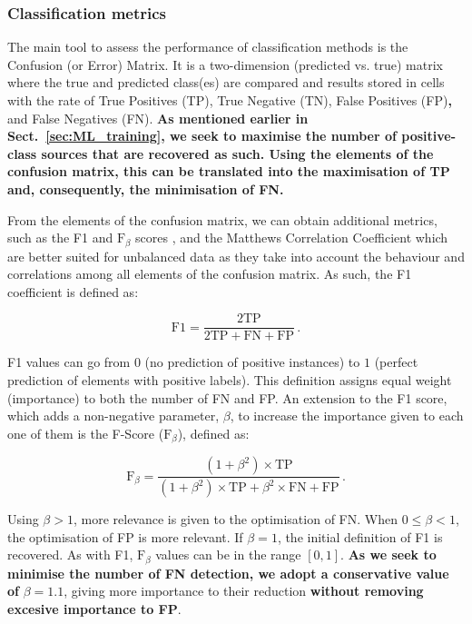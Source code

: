 \documentclass{aa}
\begin{document}
\subsubsection{Classification metrics}\label{sec:metrics_classfication}

The main tool to assess the performance of classification methods is the Confusion (or Error) Matrix. It is a two-dimension (predicted vs. true) matrix where the true and predicted class(es) are compared and results stored in cells with the rate of True Positives (TP), True Negative (TN), False Positives (FP)\textbf{,} and False Negatives (FN). \textbf{As mentioned earlier in Sect.~\ref{sec:ML_training}, we seek to maximise the number of positive-class sources that are recovered as such. Using the elements of the confusion matrix, this can be translated into the maximisation of TP and, consequently, the minimisation of FN.}

From the elements of the confusion matrix, we can obtain additional metrics, such as the F1 and $\mathrm{F}_{\beta}$ scores \citep{10.2307/1932409, sorenson1948method, van1979information}, and the Matthews Correlation Coefficient \citep[MCC;][]{10.2307/2340126, nla.cat-vn81100, MATTHEWS1975442} which are better suited for unbalanced data as they take into account the behaviour and correlations among all elements of the confusion matrix.
As such, the F1 coefficient is defined as: 

\begin{equation}\label{eq:f1}
\mathrm{F1} = \frac{2 \mathrm{TP}}{2 \mathrm{TP} + \mathrm{FN} + \mathrm{FP}}\,.
\end{equation}

\noindent 
F1 values can go from $0$ (no prediction of positive instances) to $1$ (perfect prediction of elements with positive labels). This definition assigns equal weight (importance) to both the number of FN and FP. An extension to the F1 score, which adds a non-negative parameter, $\beta$, to increase the importance given to each one of them is the F-Score ($\mathrm{F}_{\beta}$), defined as:

\begin{equation}\label{eq:f_beta}
\mathrm{F}_{\beta} = \frac{(1 + \beta^{2}) \times \mathrm{TP}}{(1 + \beta^{2}) \times \mathrm{TP} + \beta^{2} \times \mathrm{FN} + \mathrm{FP}}\,.
\end{equation}

Using ${\beta > 1}$, more relevance is given to the optimisation of FN. When ${0 \leq \beta < 1}$, the optimisation of FP is more relevant. If $\beta = 1$, the initial definition of F1 is recovered. As with F1, $\mathrm{F}_{\beta}$ values can be in the range ${[0, 1]}$. \textbf{As we seek to minimise the number of FN detection, we adopt a conservative value of} ${\beta = 1.1}$, giving more importance to their reduction \textbf{without removing excesive importance to FP}.
\end{document}
